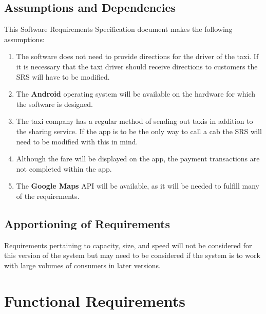 \documentclass[english]{article}
\begin{document}
\subsection{Assumptions and Dependencies}
\label{sub:assumptions_and_dependencies}
This Software Requirements Specification document makes the following assumptions:
\begin{enumerate}
	\item The software does not need to provide directions for the driver of the taxi. If it is necessary that the taxi driver should receive directions to customers the SRS will have to be modified.
	\item The  \textbf{Android} operating system will be available on the hardware for which the software is designed.
	\item The taxi company has a regular method of sending out taxis in addition to the sharing service. If the app is to be the only way to call a cab the SRS will need to be modified with this in mind.
	\item Although the fare will be displayed on the app, the payment transactions are not completed within the app. 
	\item The \textbf{Google Maps} API will be available, as it will be needed to fulfill many of the requirements.
\end{enumerate}

\subsection{Apportioning of Requirements}
\label{sub:apportioning_of_requirements}
Requirements pertaining to capacity, size, and speed will not be considered for this version of the system but may need to be considered if the system is to work with large volumes of consumers in later versions. 


\section{Functional Requirements}
\label{sec:functional_requirements}
\end{document}
